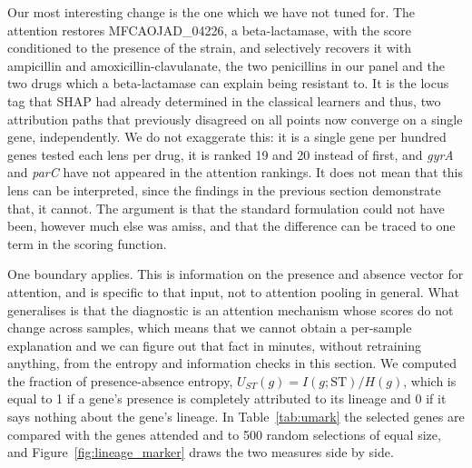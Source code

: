 \vspace{1em}

Our most interesting change is the one which we have not tuned for. The attention restores
MFCAOJAD\_04226, a beta-lactamase, with the score conditioned to the presence of the
strain, and selectively recovers it with ampicillin and amoxicillin-clavulanate, the two
penicillins in our panel and the two drugs which a beta-lactamase can explain being resistant to.
It is the locus tag that SHAP had already determined in the classical learners and thus, two
attribution paths that previously disagreed on all points now converge on a single gene,
independently. We do not exaggerate this: it is a single gene per hundred genes tested each lens
per drug, it is ranked 19 and 20 instead of first, and \textit{gyrA} and \textit{parC} have not
appeared in the attention rankings. It does not mean that this lens can be interpreted, since the
findings in the previous section demonstrate that, it cannot. The argument is that the standard
formulation could not have been, however much else was amiss, and that the difference can be
traced to one term in the scoring function.

\vspace{1em}

One boundary applies. This is information on the presence and absence vector for attention, and
is specific to that input, not to attention pooling in general. What generalises is that the
diagnostic is an attention mechanism whose scores do not change across samples, which means that
we cannot obtain a per-sample explanation and we can figure out that fact in minutes, without
retraining anything, from the entropy and information checks in this section. We computed the
fraction of presence-absence entropy, $U_{ST}(g) = I(g;\mathrm{ST})/H(g)$, which is equal to 1 if
a gene's presence is completely attributed to its lineage and 0 if it says nothing about the
gene's lineage. In Table~\ref{tab:umark} the selected genes are compared with the genes attended
and to 500 random selections of equal size, and Figure~\ref{fig:lineage_marker} draws the two
measures side by side.

